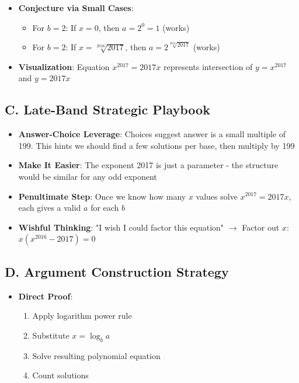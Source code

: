 \documentclass[]{article}
\begin{document}
\begin{strategicbox}
\begin{itemize}[leftmargin=*]
    \item \textbf{Conjecture via Small Cases}: 
    \begin{itemize}
        \item For $b=2$: If $x=0$, then $a=2^0=1$ (works)
        \item For $b=2$: If $x=\sqrt[2016]{2017}$, then $a=2^{\sqrt[2016]{2017}}$ (works)
    \end{itemize}
    
    \item \textbf{Visualization}: Equation $x^{2017} = 2017x$ represents intersection of $y=x^{2017}$ and $y=2017x$
\end{itemize}

\subsection*{C. Late-Band Strategic Playbook}
\begin{itemize}[leftmargin=*]
    \item \textbf{Answer-Choice Leverage}: Choices suggest answer is a small multiple of 199. This hints we should find a few solutions per base, then multiply by 199
    
    \item \textbf{Make It Easier}: The exponent 2017 is just a parameter - the structure would be similar for any odd exponent
    
    \item \textbf{Penultimate Step}: Once we know how many $x$ values solve $x^{2017} = 2017x$, each gives a valid $a$ for each $b$
    
    \item \textbf{Wishful Thinking}: "I wish I could factor this equation" $\rightarrow$ Factor out $x$: $x(x^{2016} - 2017) = 0$
\end{itemize}

\subsection*{D. Argument Construction Strategy}
\begin{itemize}[leftmargin=*]
    \item \textbf{Direct Proof}: 
    \begin{enumerate}
        \item Apply logarithm power rule
        \item Substitute $x = \log_b a$
        \item Solve resulting polynomial equation
        \item Count solutions
    \end{enumerate}
    

\end{itemize}
\end{strategicbox}
\end{document}
